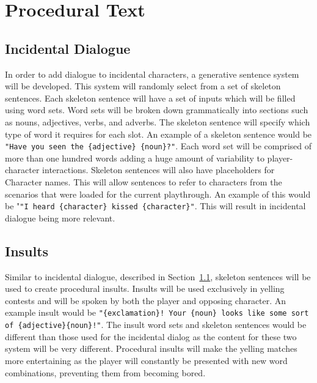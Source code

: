 \clearpage
\section{Procedural Text}

\subsection{Incidental Dialogue}
\label{sec:incidental_dialogue}
In order to add dialogue to incidental characters, a generative sentence system will be developed. This system will randomly select from a set of skeleton sentences. Each skeleton sentence will have a set of inputs which will be filled using word sets. Word sets will be broken down grammatically into sections such as nouns, adjectives, verbs, and adverbs. The skeleton sentence will specify which type of word it requires for each slot. An example of a skeleton sentence would be \verb|"Have you seen the {adjective} {noun}?"|. Each word set will be comprised  of more than one hundred words adding a huge amount of variability to player-character interactions. Skeleton sentences will also have placeholders for Character names. This will allow sentences to refer to characters from the scenarios that were loaded for the current playthrough. An example of this would be "\verb|"I heard {character} kissed {character}"|. This will result in incidental dialogue being more relevant. 

\subsection{Insults}
Similar to incidental dialogue, described in Section~\ref{sec:incidental_dialogue}, skeleton sentences  will be used to create procedural insults. Insults will be used exclusively in yelling contests and will be spoken by both the player and opposing character. An example insult would be \verb|"{exclamation}! Your {noun} looks like some sort of {adjective}{noun}!"|. The insult word sets and skeleton sentences would be different than those used for the incidental dialog as the content for these two system will be very different. Procedural insults will make the yelling matches more entertaining as the player will constantly be presented with new word combinations, preventing them from becoming bored. 